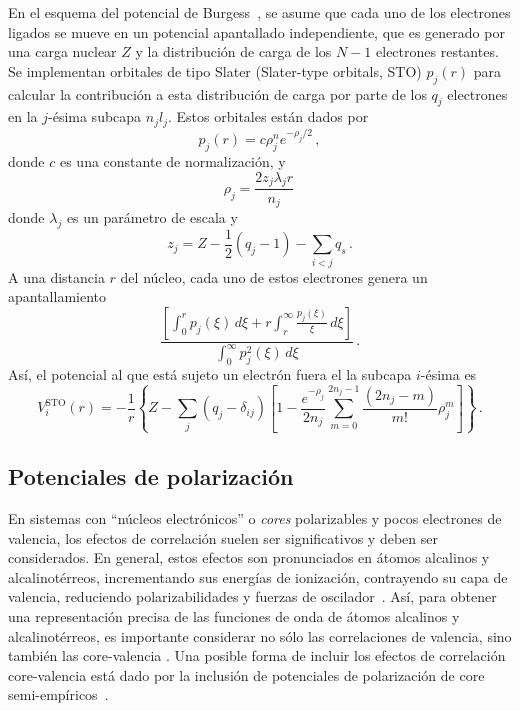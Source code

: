 En el esquema del potencial de Burgess~\cite{Burgess:89}, se asume que 
cada uno de los electrones ligados se mueve en un potencial apantallado 
independiente, que es generado por una carga nuclear $Z$ y la 
distribución de carga de los $N-1$ electrones restantes. Se implementan 
orbitales de tipo Slater (Slater-type orbitals, STO) $p_j(r)$ para 
calcular la contribución a esta distribución de carga por parte de los 
$q_j$ electrones en la $j$-ésima subcapa $n_jl_j$. Estos orbitales están 
dados por
\begin{equation}
p_j(r) = c\rho_j^n e^{-\rho_j/2}\,,
\end{equation}
donde $c$ es una constante de normalización, y 
\begin{equation}
\rho_j= \frac{2z_j\lambda_jr}{n_j}\,
\end{equation}
donde $\lambda_j$ es un parámetro de escala y 
\begin{equation}
z_j=Z-\frac{1}{2}\left(q_j-1\right)-\sum_{i<j} q_s\,.
\end{equation}
A una distancia $r$ del núcleo, cada uno de estos electrones genera un 
apantallamiento 
\begin{equation}
\frac{\left[\int_0^r p_j(\xi)\,d\xi +r\int_r^{\infty}
\frac{p_j(\xi)}{\xi}\,d\xi\right]}{\int_0^{\infty}p_j^2(\xi)\,d\xi}\,.
\end{equation}
Así, el potencial al que está sujeto un electrón fuera el la subcapa 
$i$-ésima es
\begin{equation}
V_i^{\textrm{STO}}(r)=-\frac{1}{r}\left\{Z-\sum_j(q_j-\delta_{ij})\left[1-
\frac{e^{-\rho_j}}{2n_j}\sum_{m=0}^{2n_j-1}\frac{(2n_j-m)}{m!}\rho_j^m
\right]\right\}\,.
\label{eq:STO-pot}
\end{equation}

\subsection{Potenciales de polarización}

En sistemas con ``núcleos electrónicos'' o \textit{cores} polarizables y 
pocos electrones de valencia, los efectos de correlación suelen ser 
significativos y deben ser considerados. En general, estos efectos son 
pronunciados en átomos alcalinos y alcalinotérreos, incrementando sus 
energías de ionización, contrayendo su capa de valencia, reduciendo 
polarizabilidades y fuerzas de oscilador~\cite{Muller:83}. 
Así, para obtener una representación precisa de las funciones de onda de 
átomos alcalinos y alcalinotérreos, es importante considerar no sólo las 
correlaciones de valencia, sino también las core-valencia 
\cite{Bartschat:04}. Una posible forma de incluir los efectos de 
correlación core-valencia está dado por la inclusión de potenciales de 
polarización de core semi-empíricos~\cite{Loughlin:88}.

